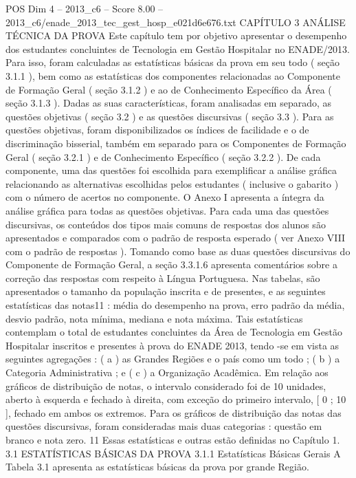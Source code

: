 \begin{textsample}{POS Dim 4 – 2013\_c6 – Score 8.00 – 2013\_c6/enade\_2013\_tec\_gest\_hosp\_e021d6e676.txt}  \label{ex:f4_pos_043}
CAPÍTULO 3 ANÁLISE TÉCNICA DA PROVA Este capítulo tem por objetivo apresentar o desempenho dos estudantes concluintes de Tecnologia em Gestão Hospitalar no ENADE/2013.
Para isso, foram calculadas as estatísticas básicas da prova em seu todo ( seção 3.1.1 ), bem como as estatísticas dos componentes relacionadas ao Componente de Formação Geral ( seção 3.1.2 ) e ao de Conhecimento Específico da Área ( seção 3.1.3 ).
Dadas as suas características, foram analisadas em separado, as questões objetivas ( seção 3.2 ) e as questões discursivas ( seção 3.3 ).
Para as questões objetivas, foram disponibilizados os índices de facilidade e o de discriminação bisserial, também em separado para os Componentes de Formação Geral ( seção 3.2.1 ) e de Conhecimento Específico ( seção 3.2.2 ).
De cada componente, uma das questões foi escolhida para exemplificar a análise gráfica relacionando as alternativas escolhidas pelos estudantes ( inclusive o gabarito ) com o número de acertos no componente.
O Anexo I apresenta a íntegra da análise gráfica para todas as questões objetivas.
Para cada uma das questões discursivas, os conteúdos dos tipos mais comuns de respostas dos alunos são apresentados e comparados com o padrão de resposta esperado ( ver Anexo VIII com o padrão de respostas ).
Tomando como base as duas questões discursivas do Componente de Formação Geral, a seção 3.3.1.6 apresenta comentários sobre a correção das respostas com respeito à Língua Portuguesa.
Nas tabelas, são apresentados o tamanho da população inscrita e de presentes, e as seguintes estatísticas das notas11 : média do desempenho na prova, erro padrão da média, desvio padrão, nota mínima, mediana e nota máxima.
Tais estatísticas contemplam o total de estudantes concluintes da Área de Tecnologia em Gestão Hospitalar inscritos e presentes à prova do ENADE 2013, tendo -se em vista as seguintes agregações : ( a ) as Grandes Regiões e o país como um todo ; ( b ) a Categoria Administrativa ; e ( c ) a Organização Acadêmica.
Em relação aos gráficos de distribuição de notas, o intervalo considerado foi de 10 unidades, aberto à esquerda e fechado à direita, com exceção do primeiro intervalo, [ 0 ; 10 ], fechado em ambos os extremos.
Para os gráficos de distribuição das notas das questões discursivas, foram consideradas mais duas categorias : questão em branco e nota zero. 11 Essas estatísticas e outras estão definidas no Capítulo 1. 3.1 ESTATÍSTICAS BÁSICAS DA PROVA 3.1.1 Estatísticas Básicas Gerais A Tabela 3.1 apresenta as estatísticas básicas da prova por grande Região.

\end{textsample}
